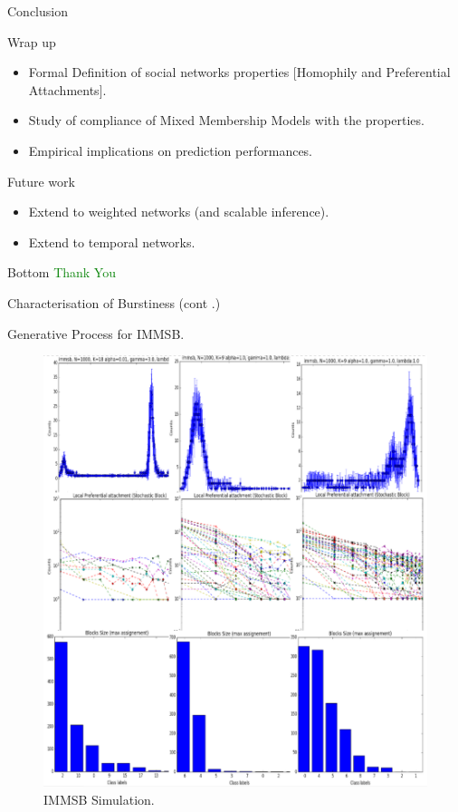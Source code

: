 \begin{frame}[c]{Conclusion}
    \begin{block}{Wrap up}
    \begin{itemize}
        \item Formal Definition of social networks properties [Homophily and Preferential Attachments].
        \item Study of compliance of Mixed Membership Models with the properties.
        \item Empirical implications on prediction performances.
    \end{itemize}
    \end{block}

    \begin{block}{Future work}
    \begin{itemize}
        \item Extend to weighted networks (and scalable inference).
        \item Extend to temporal networks. 
    \end{itemize}
    \end{block}
\end{frame}

\begin{frame}[c]{Bottom}
    \textcolor{green}{Thank You}
\end{frame}

%
%
%
%
%
%
%
%

\begin{frame}[c]{Characterisation of Burstiness (cont .)}

    Generative Process for IMMSB.

        \begin{figure}[h]
            \caption{IMMSB Simulation.}
        \includegraphics[scale=0.2]{img/mmsb_burst.pdf}
        \end{figure}
\end{frame}

